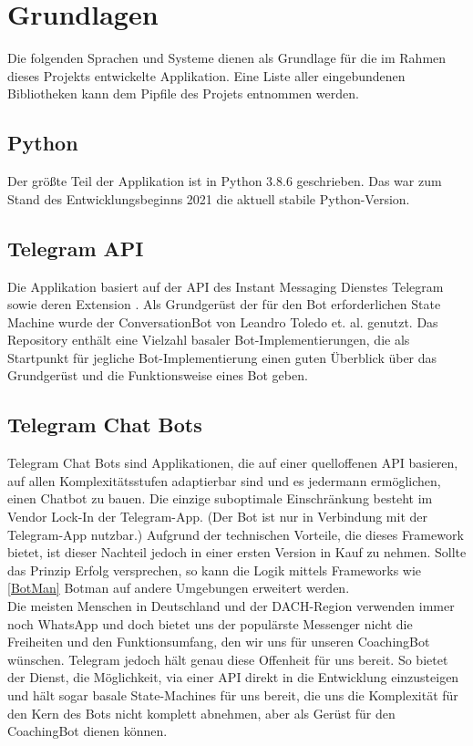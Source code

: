 \chapter{Grundlagen} \label{Grundlagen}
    Die folgenden Sprachen und Systeme dienen als Grundlage für die im Rahmen dieses Projekts entwickelte Applikation. Eine Liste aller eingebundenen Bibliotheken kann dem Pipfile des Projets entnommen werden. 


    \section{Python}
        Der größte Teil der Applikation ist in Python 3.8.6 \cite{python3.8.6} geschrieben. Das war zum Stand des Entwicklungsbeginns 2021 die aktuell stabile Python-Version.


    \section{Telegram API}
        Die Applikation basiert auf der API des Instant Messaging Dienstes Telegram \cite{telegramAPI} sowie deren Extension \cite{telegramAPIext}.
        Als Grundgerüst der für den Bot erforderlichen State Machine wurde der ConversationBot von Leandro Toledo et. al. genutzt. \cite{conversationBot} Das Repository enthält eine Vielzahl basaler Bot-Implementierungen, die als Startpunkt für jegliche Bot-Implementierung einen guten Überblick über das Grundgerüst und die Funktionsweise eines Bot geben.


    \section{Telegram Chat Bots}
        Telegram Chat Bots sind Applikationen, die auf einer quelloffenen API \cite{telegramAPI} basieren, auf allen Komplexitätsstufen adaptierbar sind und es jedermann ermöglichen, einen Chatbot zu bauen. Die einzige suboptimale Einschränkung besteht im Vendor Lock-In der Telegram-App. (Der Bot ist nur in Verbindung mit der Telegram-App \cite{telegram} nutzbar.) Aufgrund der technischen Vorteile, die dieses Framework bietet, ist dieser Nachteil jedoch in einer ersten Version in Kauf zu nehmen. Sollte das Prinzip Erfolg versprechen, so kann die Logik mittels Frameworks wie \ref{BotMan} Botman auf andere Umgebungen erweitert werden. \\
        Die meisten Menschen in Deutschland und der DACH-Region verwenden immer noch WhatsApp \cite{Nutzerzahlen} und doch bietet uns der populärste Messenger nicht die Freiheiten und den Funktionsumfang, den wir uns für unseren CoachingBot wünschen. Telegram jedoch hält genau diese Offenheit für uns bereit. \cite{telegramVergleich} So bietet der Dienst, die Möglichkeit, via einer API direkt in die Entwicklung einzusteigen und hält sogar basale State-Machines für uns bereit, die uns die Komplexität für den Kern des Bots nicht komplett abnehmen, aber als Gerüst für den CoachingBot dienen können.


